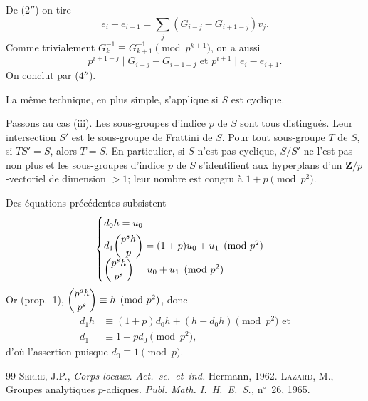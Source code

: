 \documentclass[12pt]{amsart}
\theoremstyle{plain}
\begin{document}
De ($2''$) on tire
\[
e_i - e_{i+1} = \sum_j (G_{i-j} - G_{i+1-j}) v_j.
\]
Comme trivialement $G_k^{-1} \equiv G_{k+1}^{-1} \pmod{p^{k+1}}$, on a aussi
\[
p^{i+1-j} \mid G_{i-j} - G_{i+1-j} \text{ et } p^{i+1} \mid e_i - e_{i+1}.
\]
On conclut par ($4''$).

La même technique, en plus simple, s'applique si $S$ est cyclique.

Passons au cas (iii). Les sous-groupes d'indice $p$ de $S$ sont tous distingués. Leur intersection $S'$ est le sous-groupe de Frattini de $S$. Pour tout sous-groupe $T$ de $S$, si $TS' = S$, alors $T = S$. En particulier, si $S$ n'est pas cyclique, $S/S'$ ne l'est pas non plus et les sous-groupes d'indice $p$ de $S$ s'identifient aux hyperplans d'un $\mathbf{Z}/p$-vectoriel de dimension $> 1$; leur nombre est congru à $1+p \pmod{p^2}$.

Des équations précédentes subsistent
\[
\begin{cases}
d_0 h = u_0 \\[4pt]
d_1 \dbinom{p^s h}{p} = (1+p)u_0 + u_1 \pmod{p^2} \\[4pt]
\dbinom{p^s h}{p^s} = u_0 + u_1 \pmod{p^2}
\end{cases}
\]
Or (prop.~1), $\dbinom{p^s h}{p^s} \equiv h \pmod{p^2}$, donc
\begin{align*}
d_1 h &\equiv (1+p)d_0 h + (h - d_0 h) \pmod{p^2} \text{ et}\\
d_1 &\equiv 1 + pd_0 \pmod{p^2},
\end{align*}
d'où l'assertion puisque $d_0 \equiv 1 \pmod p$.

\begin{thebibliography}{99}
\bibitem{[1]} \textsc{Serre, J.P.,} \textit{Corps locaux. Act.~sc.~et~ind.} Hermann, 1962.
\bibitem{[2]} \textsc{Lazard, M.,} Groupes analytiques $p$-adiques. \textit{Publ. Math. I.~H.~E.~S.,} n$^\circ$~26, 1965.
\end{thebibliography}
\end{document}
